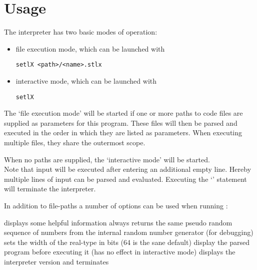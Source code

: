 \newpage

\section{Usage}

The \setlX{} interpreter has two basic modes of operation:

\begin{itemize}
	\item file execution mode, which can be launched with
\begin{lstlisting}[frame=none,numbers=none]
setlX <path>/<name>.stlx
\end{lstlisting}
	\item interactive mode, which can be launched with
\begin{lstlisting}[frame=none,numbers=none]
setlX
\end{lstlisting}
\end{itemize}

The `file execution mode' will be started if one or more paths to code files are supplied as parameters for this program. These files will then be parsed and executed in the order in which they are listed as parameters. When executing multiple files, they share the outermost scope.

When no paths are supplied, the `interactive mode' will be started.\\
Note that input will be executed after entering an additional empty line. Hereby multiple lines of input can be parsed and evaluated. Executing the `' statement will terminate the interpreter.


In addition to file-paths a number of options can be used when running \setlX{}:

\begin{itemize}
	      {displays some helpful information}
	      {always returns the same pseudo random sequence of numbers from the internal random number generator (for debugging)}
           {sets the width of the real-type in bits (64 is the sane default)}
           {display the parsed program before executing it (has no effect in interactive mode)}
           {displays the interpreter version and terminates}
\end{itemize}


